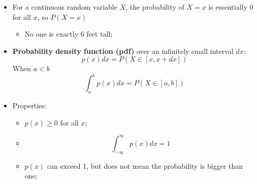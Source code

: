     \begin{itemize}
      \item For a continuous random variable $ X $, the probability of $ X = x $ is essentially $ 0 $ for all $ x $, so $ P(X = x) $
      \begin{itemize}
        \item No one is exactly 6 feet tall;
      \end{itemize}

      \item \textbf{Probability density function (pdf)} over an infinitely small interval $ dx $:
      \begin{equation}
        p (x) dx = P \left( X \in \left[ x, x + dx \right] \right)
      \end{equation}
      When $ a < b $
      \begin{equation}
        \int_{a}^{b} p(x) dx = P \left( X \in \left[ a, b \right] \right)
      \end{equation}

      \item Properties:
      \begin{itemize}
        \item $ p(x) \ge 0 $ for all $ x $;
        \item %
        \begin{displaymath}
          \int_{- \infty}^{\infty} p(x) dx = 1
        \end{displaymath}

        \item $ p(x) $ can exceed 1, but does not mean the probability is bigger than one;
      \end{itemize}
    \end{itemize}
